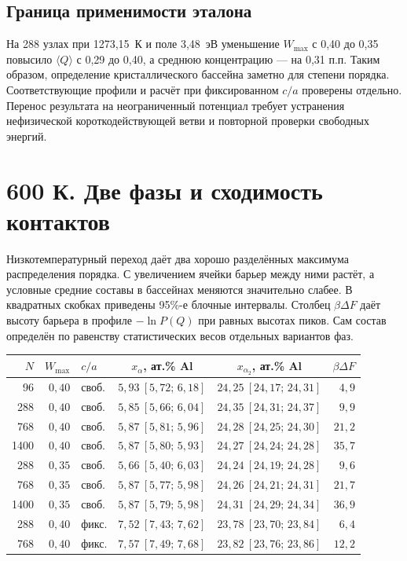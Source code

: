 \documentclass[11pt,a4paper]{article}
\begin{document}
\subsection*{Граница применимости эталона}
На 288 узлах при 1273,15~К и поле 3,48~эВ уменьшение \(W_{\max}\)
с 0,40 до 0,35 повысило \(\langle Q\rangle\) с 0,29 до 0,40,
а среднюю концентрацию --- на 0,31 п.п. Таким образом, определение
кристаллического бассейна заметно для степени порядка. Соответствующие
профили и расчёт при фиксированном \(c/a\) проверены отдельно. Перенос
результата на неограниченный потенциал требует устранения нефизической
короткодействующей ветви и повторной проверки свободных энергий.

\clearpage

\section*{600 К. Две фазы и сходимость контактов}
Низкотемпературный переход даёт два хорошо разделённых максимума
распределения порядка. С увеличением ячейки барьер между ними растёт,
а условные средние составы в бассейнах меняются значительно слабее.
В квадратных скобках приведены 95\%-е блочные интервалы.
Столбец \(\beta\Delta F\) даёт высоту барьера в профиле
\(-\ln P(Q)\) при равных высотах пиков. Сам состав определён по
равенству статистических весов отдельных вариантов фаз.

\begin{center}\footnotesize\setlength{\tabcolsep}{4.6pt}
\begin{tabular}{@{}rrlccr@{}}\toprule
\(N\)& \(W_{\max}\) & \(c/a\) & \(x_\alpha\), ат.\% Al & \(x_{\alpha_2}\), ат.\% Al & \(\beta\Delta F\)\\\midrule
96 & \(0{,}40\) & своб. & \(5{,}93\ [5{,}72;\,6{,}18]\) & \(24{,}25\ [24{,}17;\,24{,}31]\) & \(4{,}9\)\\
288 & \(0{,}40\) & своб. & \(5{,}85\ [5{,}66;\,6{,}04]\) & \(24{,}35\ [24{,}31;\,24{,}37]\) & \(9{,}9\)\\
768 & \(0{,}40\) & своб. & \(5{,}87\ [5{,}81;\,5{,}96]\) & \(24{,}28\ [24{,}25;\,24{,}30]\) & \(21{,}2\)\\
1400 & \(0{,}40\) & своб. & \(5{,}87\ [5{,}80;\,5{,}93]\) & \(24{,}27\ [24{,}24;\,24{,}28]\) & \(35{,}7\)\\
288 & \(0{,}35\) & своб. & \(5{,}66\ [5{,}40;\,6{,}03]\) & \(24{,}24\ [24{,}19;\,24{,}28]\) & \(9{,}6\)\\
768 & \(0{,}35\) & своб. & \(5{,}87\ [5{,}77;\,5{,}98]\) & \(24{,}26\ [24{,}21;\,24{,}31]\) & \(21{,}7\)\\
1400 & \(0{,}35\) & своб. & \(5{,}87\ [5{,}79;\,5{,}98]\) & \(24{,}31\ [24{,}29;\,24{,}34]\) & \(36{,}9\)\\
288 & \(0{,}40\) & фикс. & \(7{,}52\ [7{,}43;\,7{,}62]\) & \(23{,}78\ [23{,}70;\,23{,}84]\) & \(6{,}4\)\\
768 & \(0{,}40\) & фикс. & \(7{,}57\ [7{,}49;\,7{,}68]\) & \(23{,}82\ [23{,}76;\,23{,}86]\) & \(12{,}2\)\\
\bottomrule\end{tabular}\end{center}
\end{document}
